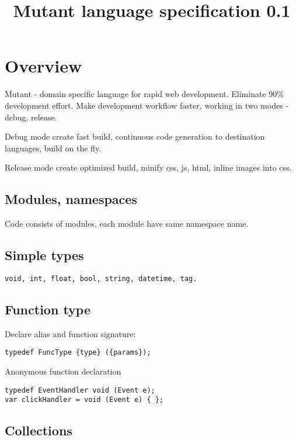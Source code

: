 \documentclass[a4paper,12pt]{book}
\begin{document}
\title{Mutant language specification 0.1}
\maketitle

\chapter{Overview}

Mutant - domain specific language for rapid web development. Eliminate
90\% development effort. Make development workflow faster, working in two
modes - debug, release.

Debug mode create fast build, continuous code generation to destination
languages, build on the fly.

Release mode create optimized build, minify css, js, html, inline images into
css.

\section{Modules, namespaces}
Code consists of modules, each module have same namespace name.

\section{Simple types}

\begin{verbatim}
void, int, float, bool, string, datetime, tag.
\end{verbatim}

\section{Function type}

Declare alias and function signature;

\begin{verbatim}
typedef FuncType {type} ({params});
\end{verbatim}

Anonymous function declaration

\begin{verbatim}
typedef EventHandler void (Event e);
var clickHandler = void (Event e) { };
\end{verbatim}

\section{Collections}
\end{document}
